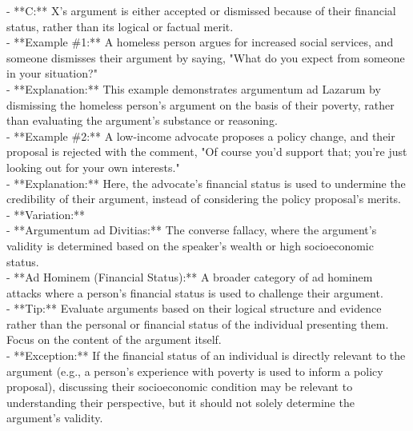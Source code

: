 \documentclass[a4paper,12pt,single,pdftex]{scrartcl}
\begin{document}
    
        - **C:** X’s argument is either accepted or dismissed because of their financial status, rather than its logical or factual merit.
    \\

    
      - **Example \#1:** A homeless person argues for increased social services, and someone dismisses their argument by saying, "What do you expect from someone in your situation?"
    \\

    
      - **Explanation:** This example demonstrates argumentum ad Lazarum by dismissing the homeless person's argument on the basis of their poverty, rather than evaluating the argument’s substance or reasoning.
    \\

    
      - **Example \#2:** A low-income advocate proposes a policy change, and their proposal is rejected with the comment, "Of course you'd support that; you're just looking out for your own interests."
    \\

    
      - **Explanation:** Here, the advocate's financial status is used to undermine the credibility of their argument, instead of considering the policy proposal’s merits.
    \\

    
      - **Variation:**
    \\

    
        - **Argumentum ad Divitias:** The converse fallacy, where the argument's validity is determined based on the speaker’s wealth or high socioeconomic status.
    \\

    
        - **Ad Hominem (Financial Status):** A broader category of ad hominem attacks where a person’s financial status is used to challenge their argument.
    \\

    
      - **Tip:** Evaluate arguments based on their logical structure and evidence rather than the personal or financial status of the individual presenting them. Focus on the content of the argument itself.
    \\

    
      - **Exception:** If the financial status of an individual is directly relevant to the argument (e.g., a person’s experience with poverty is used to inform a policy proposal), discussing their socioeconomic condition may be relevant to understanding their perspective, but it should not solely determine the argument’s validity.
    \\
\end{document}
